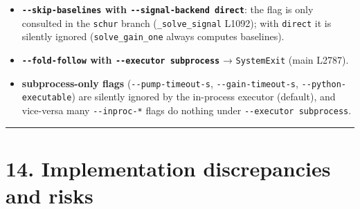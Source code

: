 \documentclass[
  10pt,
]{article}
\begin{document}
\begin{itemize}
\item
  \textbf{\texttt{-\/-skip-baselines} with
  \texttt{-\/-signal-backend\ direct}}: the flag is only consulted in
  the \texttt{schur} branch (\texttt{\_solve\_signal} L1092); with
  \texttt{direct} it is silently ignored (\texttt{solve\_gain\_one}
  always computes baselines).
\item
  \textbf{\texttt{-\/-fold-follow} with
  \texttt{-\/-executor\ subprocess}} → \texttt{SystemExit} (main L2787).
\item
  \textbf{subprocess-only flags} (\texttt{-\/-pump-timeout-s},
  \texttt{-\/-gain-timeout-s}, \texttt{-\/-python-executable}) are
  silently ignored by the in-process executor (default), and vice-versa
  many \texttt{-\/-inproc-*} flags do nothing under
  \texttt{-\/-executor\ subprocess}.
\end{itemize}

\begin{center}\rule{0.5\linewidth}{0.5pt}\end{center}

\section{14. Implementation discrepancies and
risks}\label{implementation-discrepancies-and-risks}
\end{document}
